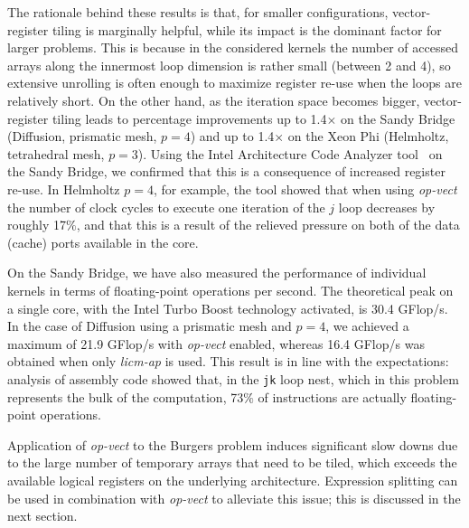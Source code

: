 \documentclass[conference]{IEEEtran}
\begin{document}
The rationale behind these results is that, for smaller configurations, vector-register tiling is marginally helpful, while its impact is the dominant factor for larger problems. This is because in the considered kernels the number of accessed arrays along the innermost loop dimension is rather small (between 2 and 4), so extensive unrolling is often enough to maximize register re-use when the loops are relatively short. On the other hand, as the iteration space becomes bigger, vector-register tiling leads to percentage improvements up to 1.4$\times$ on the Sandy Bridge (Diffusion, prismatic mesh, $p=4$) and up to 1.4$\times$ on the Xeon Phi (Helmholtz, tetrahedral mesh, $p=3$). Using the Intel Architecture Code Analyzer tool~\cite{IACA} on the Sandy Bridge, we confirmed that this is a consequence of increased register re-use. In Helmholtz $p=4$, for example, the tool showed that when using \emph{op-vect} the number of clock cycles to execute one iteration of the $j$ loop decreases by roughly 17$\%$, and that this is a result of the relieved pressure on both of the data (cache) ports available in the core.

On the Sandy Bridge, we have also measured the performance of individual kernels in terms of floating-point operations per second. The theoretical peak on a single core, with the Intel Turbo Boost technology activated, is 30.4 GFlop/s. In the case of Diffusion using a prismatic mesh and $p=4$, we achieved a maximum of 21.9 GFlop/s with \emph{op-vect} enabled, whereas 16.4 GFlop/s was obtained when only \emph{licm-ap} is used. This result is in line with the expectations: analysis of assembly code showed that, in the \texttt{jk} loop nest, which in this problem represents the bulk of the computation, 73$\%$ of instructions are actually floating-point operations.

Application of \emph{op-vect} to the Burgers problem induces significant slow downs due to the large number of temporary arrays that need to be tiled, which exceeds the available logical registers on the underlying architecture. Expression splitting can be used in combination with \emph{op-vect} to alleviate this issue; this is discussed in the next section.
\end{document}
